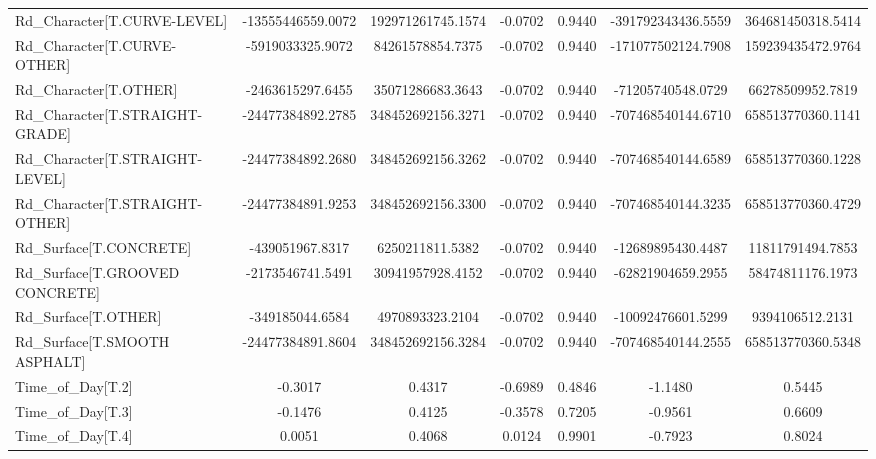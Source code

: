 \begin{longtable}{p{4cm}cccccc}
Rd\_Character[T.CURVE-LEVEL]                        & -13555446559.0072 & 192971261745.1574 & -0.0702 &       0.9440 & -391792343436.5559 & 364681450318.5414 \\
Rd\_Character[T.CURVE-OTHER]                        &  -5919033325.9072 &  84261578854.7375 & -0.0702 &       0.9440 & -171077502124.7908 & 159239435472.9764 \\
Rd\_Character[T.OTHER]                              &  -2463615297.6455 &  35071286683.3643 & -0.0702 &       0.9440 &  -71205740548.0729 &  66278509952.7819 \\
Rd\_Character[T.STRAIGHT-GRADE]                     & -24477384892.2785 & 348452692156.3271 & -0.0702 &       0.9440 & -707468540144.6710 & 658513770360.1141 \\
Rd\_Character[T.STRAIGHT-LEVEL]                     & -24477384892.2680 & 348452692156.3262 & -0.0702 &       0.9440 & -707468540144.6589 & 658513770360.1228 \\
Rd\_Character[T.STRAIGHT-OTHER]                     & -24477384891.9253 & 348452692156.3300 & -0.0702 &       0.9440 & -707468540144.3235 & 658513770360.4729 \\
Rd\_Surface[T.CONCRETE]                             &   -439051967.8317 &   6250211811.5382 & -0.0702 &       0.9440 &  -12689895430.4487 &  11811791494.7853 \\
Rd\_Surface[T.GROOVED CONCRETE]                     &  -2173546741.5491 &  30941957928.4152 & -0.0702 &       0.9440 &  -62821904659.2955 &  58474811176.1973 \\
Rd\_Surface[T.OTHER]                                &   -349185044.6584 &   4970893323.2104 & -0.0702 &       0.9440 &  -10092476601.5299 &   9394106512.2131 \\
Rd\_Surface[T.SMOOTH ASPHALT]                       & -24477384891.8604 & 348452692156.3284 & -0.0702 &       0.9440 & -707468540144.2555 & 658513770360.5348 \\
Time\_of\_Day[T.2]                                   &           -0.3017 &            0.4317 & -0.6989 &       0.4846 &            -1.1480 &            0.5445 \\
Time\_of\_Day[T.3]                                   &           -0.1476 &            0.4125 & -0.3578 &       0.7205 &            -0.9561 &            0.6609 \\
Time\_of\_Day[T.4]                                   &            0.0051 &            0.4068 &  0.0124 &       0.9901 &            -0.7923 &            0.8024 \\

\end{longtable}
